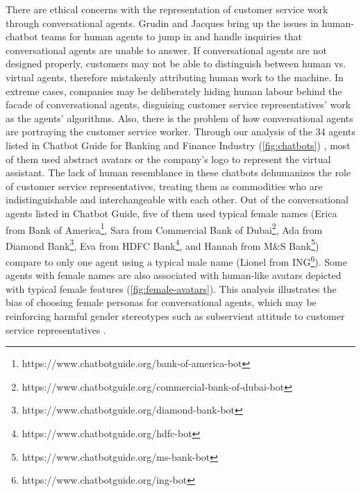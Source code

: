 \documentclass{sigchi-ext}
\begin{document}
There are ethical concerns with the representation of customer service work through conversational agents. Grudin and Jacques \cite{grudin2019chatbots} bring up the issues in human-chatbot teams for human agents to jump in and handle inquiries that conversational agents are unable to answer. If conversational agents are not designed properly, customers may not be able to distinguish between human vs. virtual agents, therefore mistakenly attributing human work to the machine. In extreme cases, companies may be deliberately hiding human labour behind the facade of conversational agents, disguising customer service representatives' work as the agents' algorithms. Also, there is the problem of how conversational agents are portraying the customer service worker. Through our analysis of the 34 agents listed in Chatbot Guide for Banking and Finance Industry \cite{chatbotguide} (\autoref{fig:chatbots}) , most of them used abstract avatars or the company's logo to represent the virtual assistant. The lack of human resemblance in these chatbots dehumanizes the role of customer service representatives, treating them as commodities who are indistinguishable and interchangeable with each other. Out of the conversational agents listed in Chatbot Guide, five of them used typical female names (Erica from Bank of America\footnote{https://www.chatbotguide.org/bank-of-america-bot}, Sara from Commercial Bank of Dubai\footnote{https://www.chatbotguide.org/commercial-bank-of-dubai-bot}, Ada from Diamond Bank\footnote{https://www.chatbotguide.org/diamond-bank-bot}, Eva from HDFC Bank\footnote{https://www.chatbotguide.org/hdfc-bot}, and Hannah from M\&S Bank\footnote{https://www.chatbotguide.org/ms-bank-bot}) compare to only one agent using a typical male name (Lionel from ING\footnote{https://www.chatbotguide.org/ing-bot}). Some agents with female names are also associated with human-like avatars depicted with typical female features (\autoref{fig:female-avatars}). This analysis illustrates the bias of choosing female personas for conversational agents, which may be reinforcing harmful gender stereotypes such as subservient attitude to customer service representatives \cite{ruane2019conversational}.
\end{document}
